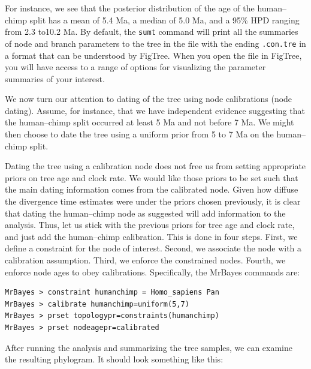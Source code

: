 \documentclass[12pt]{book}
\newcommand{\ttt}[1]{\texttt{#1} }
\begin{document}
For instance, we see that the posterior distribution of the age of the human--chimp split has a
mean of 5.4 Ma, a median of 5.0 Ma, and a 95\% HPD ranging from 2.3 to10.2 Ma. By default, the
\ttt{sumt} command will print all the summaries of node and branch parameters to the tree in the
file with the ending \texttt{.con.tre} in a format that can be understood by FigTree. When you open
the file in FigTree, you will have access to a range of options for visualizing the parameter
summaries of your interest.

We now turn our attention to dating of the tree using node calibrations (node dating). Assume, for
instance, that we have independent evidence suggesting that the human--chimp split occurred at
least 5 Ma and not before 7 Ma.  We might then choose to date the tree using a uniform prior from 5
to 7 Ma on the human--chimp split.

Dating the tree using a calibration node does not free us from setting appropriate priors on tree
age and clock rate. We would like those priors to be set such that the main dating information
comes from the calibrated node. Given how diffuse the divergence time estimates were under the
priors chosen previously, it is clear that dating the human--chimp node as suggested will add
information to the analysis. Thus, let us stick with the previous priors for tree age and clock
rate, and just add the human--chimp calibration. This is done in four steps. First, we define a
constraint for the node of interest. Second, we associate the node with a calibration assumption.
Third, we enforce the constrained nodes. Fourth, we enforce node ages to obey calibrations.
Specifically, the MrBayes commands are:

\begin{singlespacing}
\begin{verbatim}
MrBayes > constraint humanchimp = Homo_sapiens Pan
MrBayes > calibrate humanchimp=uniform(5,7)
MrBayes > prset topologypr=constraints(humanchimp)
MrBayes > prset nodeagepr=calibrated
\end{verbatim}
\end{singlespacing}

After running the analysis and summarizing the tree samples, we can examine the resulting
phylogram.  It should look something like this:
\end{document}
